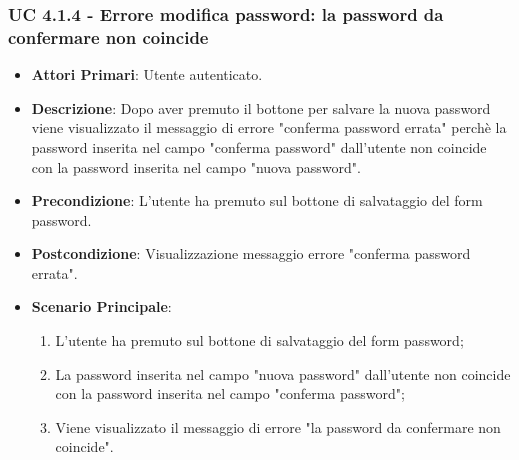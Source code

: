 			\subsubsection{UC 4.1.4 - Errore modifica password: la password da confermare non coincide}
			\begin{itemize}
				\item \textbf{Attori Primari}: Utente autenticato.
				\item \textbf{Descrizione}: Dopo aver premuto il bottone per salvare la nuova password viene visualizzato il messaggio di errore "conferma password errata" perchè la password inserita nel campo "conferma password" dall'utente non coincide con la password inserita nel campo "nuova password".
				\item \textbf{Precondizione}: L'utente ha premuto sul bottone di salvataggio del form password.
				\item \textbf{Postcondizione}: Visualizzazione messaggio errore "conferma password errata".
				\item \textbf{Scenario Principale}:
				\begin{enumerate}
					\item{L'utente ha premuto sul bottone di salvataggio del form password;}
					\item{La password inserita nel campo "nuova password" dall'utente non coincide con la password inserita nel campo "conferma password";}
					\item{Viene visualizzato il messaggio di errore "la password da confermare non coincide".}
				\end{enumerate}
			\end{itemize}
			
